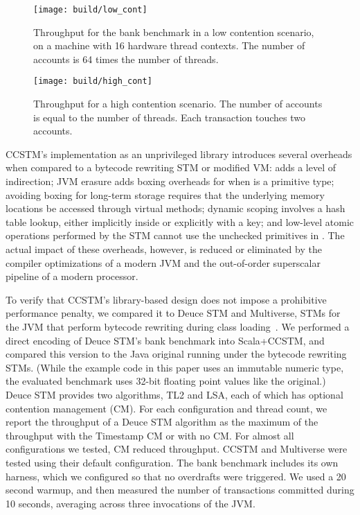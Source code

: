 
\begin{figure}
  \centering \texttt{[image: build/low\_cont]}

\caption{Throughput for the bank benchmark in a low contention scenario,
on a machine with 16 hardware thread contexts.  The number of accounts
is 64 times the number of threads.}

  \label{fig:lowcont}
\end{figure}

\begin{figure}
  \centering \texttt{[image: build/high\_cont]}

\caption{Throughput for a high contention scenario.  The number of accounts is
equal to the number of threads.  Each transaction touches two accounts.}

  \label{fig:highcont}
\end{figure}

CCSTM's implementation as an unprivileged library introduces several
overheads when compared to a bytecode rewriting STM or modified VM:
 adds a level of indirection; JVM erasure adds boxing overheads
for  when  is a primitive type; avoiding boxing
for long-term storage requires that the underlying memory locations
be accessed through virtual methods; dynamic scoping involves a hash
table lookup, either implicitly inside  or explicitly
with a  key; and low-level atomic operations performed by
the STM cannot use the unchecked primitives in .
The actual impact of these overheads, however, is reduced or eliminated
by the compiler optimizations of a modern JVM and the out-of-order
superscalar pipeline of a modern processor.

To verify that CCSTM's library-based design does not impose a prohibitive
performance penalty, we compared it to Deuce STM and Multiverse, STMs for
the JVM that perform bytecode rewriting during class
loading~\cite{deucestm,multiverse}.
We performed a direct encoding of Deuce STM's bank benchmark into
Scala+CCSTM, and compared this version to the Java original running
under the bytecode rewriting STMs.  (While the example code in this paper uses an
immutable  numeric type, the evaluated benchmark uses 32-bit
floating point values like the original.)  Deuce STM provides two algorithms,
TL2 and LSA, each of which has optional contention management (CM).
For each configuration and thread count, we report the throughput of a Deuce STM algorithm
as the maximum of the throughput with the Timestamp CM or with no CM.
For almost all configurations we tested, CM reduced
throughput.  CCSTM and Multiverse were tested using their default
configuration.
The bank benchmark includes its own harness, which we configured so
that no overdrafts were triggered.  We used a 20 second warmup, and
then measured the number of transactions committed during 10 seconds,
averaging across three invocations of the JVM.

